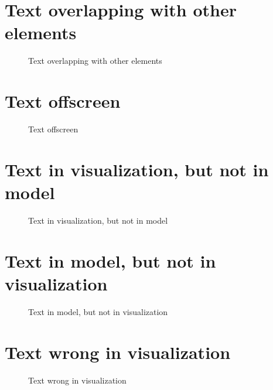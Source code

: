 \documentclass{article}
\begin{document}
\section{Text overlapping with other elements}
\begin{figure}[H]
    \centering
    \caption{Text overlapping with other elements}
\end{figure}
\newpage

\section{Text offscreen}
\begin{figure}[H]
    \centering
    \caption{Text offscreen}
\end{figure}
\newpage

\section{Text in visualization, but not in model}
\begin{figure}[H]
    \centering
    \caption{Text in visualization, but not in model}
\end{figure}
\newpage

\section{Text in model, but not in visualization}
\begin{figure}[H]
    \centering
    \caption{Text in model, but not in visualization}
\end{figure}
\newpage

\section{Text wrong in visualization}
\begin{figure}[H]
    \centering
    \caption{Text wrong in visualization}
\end{figure}
\newpage
\end{document}
